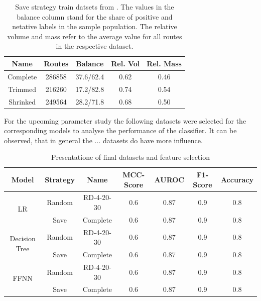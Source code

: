 \begin{table}[ht]
    \centering
    \begin{tabular}{c c c c c}
        \toprule
        Name     & Routes & Balance   & Rel. Vol & Rel. Mass \\
        \midrule
        Complete & 286858 & 37.6/62.4 & 0.62     & 0.46      \\
        Trimmed  & 216260 & 17.2/82.8 & 0.74     & 0.54      \\
        Shrinked & 249564 & 28.2/71.8 & 0.68     & 0.50      \\
        \bottomrule
    \end{tabular}
    \caption[Save strategy train datsets from \gendreauDataSetText.]{Save strategy train datsets from \gendreauDataSetText.
        The values in the balance column stand for the share of positive and netative labels in the sample population. The relative volume
        and mass refer to the average value for all routes in the respective dataset.}
    \label{tab:saved_instances_gendreau}
\end{table}

For the upcoming parameter study the following datasets were selected for the corresponding models
to analyse the performance of the classifier. It can be observed, that in general the ... datasets
do have more influence.

\begin{table}[ht]
    \centering
    \begin{tabular}{c c c c c c c}
        \toprule
        Model                          & Strategy & Name       & \gls{MCC}-Score & \gls{AUROC} & F1-Score & Accuracy \\
        \midrule
        \multirow{2}{*}{\gls{LR}}      & Random   & RD-4-20-30 & 0.6             & 0.87        & 0.9      & 0.8      \\
                                       & Save     & Complete   & 0.6             & 0.87        & 0.9      & 0.8      \\
        \midrule
        \multirow{2}{*}{Decision Tree} & Random   & RD-4-20-30 & 0.6             & 0.87        & 0.9      & 0.8      \\
                                       & Save     & Complete   & 0.6             & 0.87        & 0.9      & 0.8      \\
        \midrule
        \multirow{2}{*}{\gls{FFNN}}    & Random   & RD-4-20-30 & 0.6             & 0.87        & 0.9      & 0.8      \\
                                       & Save     & Complete   & 0.6             & 0.87        & 0.9      & 0.8      \\

        \bottomrule
    \end{tabular}
    \caption{Presentatione of final datasets and feature selection}
    \label{tab:final_dataset_features}
\end{table}

